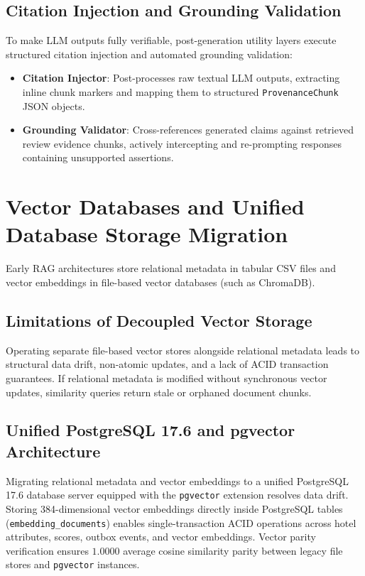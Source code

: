 \subsection{Citation Injection and Grounding Validation}
To make LLM outputs fully verifiable, post-generation utility layers execute structured citation injection and automated grounding validation:
\begin{itemize}
    \item \textbf{Citation Injector}: Post-processes raw textual LLM outputs, extracting inline chunk markers and mapping them to structured \texttt{ProvenanceChunk} JSON objects.
    \item \textbf{Grounding Validator}: Cross-references generated claims against retrieved review evidence chunks, actively intercepting and re-prompting responses containing unsupported assertions.
\end{itemize}

\section{Vector Databases and Unified Database Storage Migration}
Early RAG architectures store relational metadata in tabular CSV files and vector embeddings in file-based vector databases (such as ChromaDB).

\subsection{Limitations of Decoupled Vector Storage}
Operating separate file-based vector stores alongside relational metadata leads to structural data drift, non-atomic updates, and a lack of ACID transaction guarantees. If relational metadata is modified without synchronous vector updates, similarity queries return stale or orphaned document chunks.

\subsection{Unified PostgreSQL 17.6 and pgvector Architecture}
Migrating relational metadata and vector embeddings to a unified PostgreSQL 17.6 database server equipped with the \texttt{pgvector} extension resolves data drift. Storing 384-dimensional vector embeddings directly inside PostgreSQL tables (\texttt{embedding\_documents}) enables single-transaction ACID operations across hotel attributes, scores, outbox events, and vector embeddings. Vector parity verification ensures $1.0000$ average cosine similarity parity between legacy file stores and \texttt{pgvector} instances.

